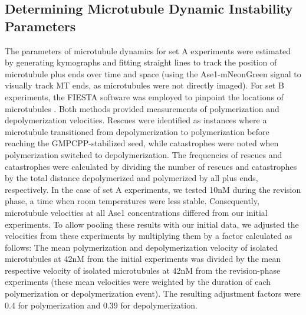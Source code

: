 \subsection{Determining Microtubule Dynamic Instability Parameters}
The parameters of microtubule dynamics for set A experiments were estimated by generating kymographs and fitting straight lines to track the position of microtubule plus ends over time and space (using the Ase1-mNeonGreen signal to visually track MT ends, as microtubules were not directly imaged). For set B experiments, the FIESTA software was employed to pinpoint the locations of microtubules \parencite{RUHNOW20112820}. Both methods provided measurements of polymerization and depolymerization velocities. Rescues were identified as instances where a microtubule transitioned from depolymerization to polymerization before reaching the GMPCPP-stabilized seed, while catastrophes were noted when polymerization switched to depolymerization. The frequencies of rescues and catastrophes were calculated by dividing the number of rescues and catastrophes by the total distance depolymerized and polymerized by all plus ends, respectively. In the case of set A experiments, we tested 10nM during the revision phase, a time when room temperatures were less stable. Consequently, microtubule velocities at all Ase1 concentrations differed from our initial experiments. To allow pooling these results with our initial data, we adjusted the velocities from these experiments by multiplying them by a factor calculated as follows: The mean polymerization and depolymerization velocity of isolated microtubules at 42nM from the initial experiments was divided by the mean respective velocity of isolated microtubules at 42nM from the revision-phase experiments (these mean velocities were weighted by the duration of each polymerization or depolymerization event). The resulting adjustment factors were 0.4 for polymerization and 0.39 for depolymerization.

